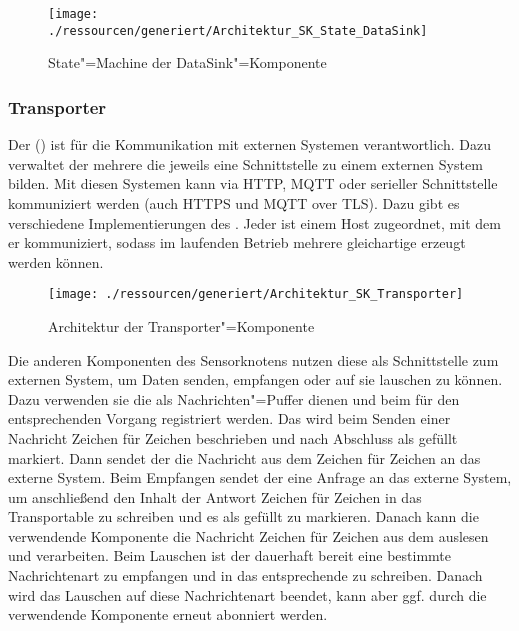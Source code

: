 \begin{figure}[!htb]
    \centering
    \texttt{[image: ./ressourcen/generiert/Architektur\_SK\_State\_DataSink]}
    \caption{State"=Machine der DataSink"=Komponente}
    \label{fig:Architektur_SK_State_DataSink}
\end{figure}

\subsubsection{Transporter}
Der  () ist für die Kommunikation mit externen Systemen verantwortlich.
Dazu verwaltet der  mehrere  die jeweils eine Schnittstelle zu einem externen System bilden.
Mit diesen Systemen kann via HTTP, MQTT oder serieller Schnittstelle kommuniziert werden (auch HTTPS und MQTT over TLS).
Dazu gibt es verschiedene Implementierungen des .
Jeder  ist einem Host zugeordnet, mit dem er kommuniziert, sodass im laufenden Betrieb mehrere gleichartige  erzeugt werden können.

\begin{figure}[!htb]
    \centering
    \texttt{[image: ./ressourcen/generiert/Architektur\_SK\_Transporter]}
    \caption{Architektur der Transporter"=Komponente}
    \label{fig:Architektur_SK_Transporter}
\end{figure}

Die anderen Komponenten des Sensorknotens nutzen diese als Schnittstelle zum externen System, um Daten senden, empfangen oder auf sie lauschen zu können.
Dazu verwenden sie  die als Nachrichten"=Puffer dienen und beim  für den entsprechenden Vorgang registriert werden.
Das  wird beim Senden einer Nachricht Zeichen für Zeichen beschrieben und nach Abschluss als gefüllt markiert.
Dann sendet der  die Nachricht aus dem  Zeichen für Zeichen an das externe System.
Beim Empfangen sendet der  eine Anfrage an das externe System, um anschließend den Inhalt der Antwort Zeichen für Zeichen in das Transportable zu schreiben und es als gefüllt zu markieren.
Danach kann die verwendende Komponente die Nachricht Zeichen für Zeichen aus dem  auslesen und verarbeiten.
Beim Lauschen ist der  dauerhaft bereit eine bestimmte Nachrichtenart zu empfangen und in das entsprechende  zu schreiben.
Danach wird das Lauschen auf diese Nachrichtenart beendet, kann aber ggf.
durch die verwendende Komponente erneut abonniert werden.

